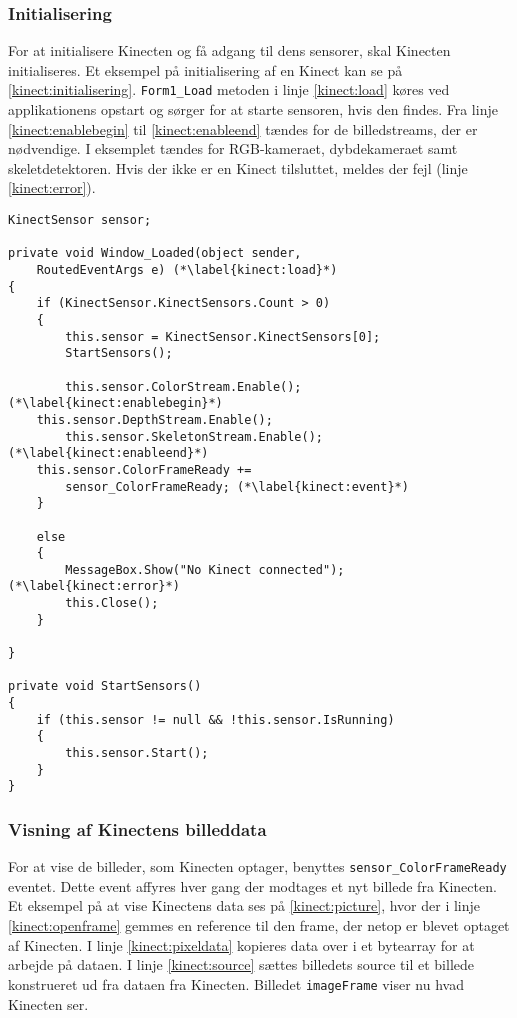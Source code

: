 \subsubsection{Initialisering}
For at initialisere Kinecten og få adgang til dens sensorer, skal Kinecten initialiseres.
Et eksempel på initialisering af en Kinect kan se på \cref{kinect:initialisering}. \lstinline[style=csharp]|Form1_Load| metoden i linje \ref{kinect:load} køres ved applikationens opstart og sørger for at starte sensoren, hvis den findes. Fra linje \ref{kinect:enablebegin} til \ref{kinect:enableend} tændes for de billedstreams, der er nødvendige. I eksemplet tændes for RGB-kameraet, dybdekameraet samt skeletdetektoren. Hvis der ikke er en Kinect tilsluttet, meldes der fejl (linje \ref{kinect:error}).

\begin{lstlisting}[style=csharp, label=kinect:initialisering, caption={Initialisering af en Kinect sensor.}]
KinectSensor sensor;

private void Window_Loaded(object sender,
	RoutedEventArgs e) (*\label{kinect:load}*)
{
    if (KinectSensor.KinectSensors.Count > 0)
    {
        this.sensor = KinectSensor.KinectSensors[0];
        StartSensors();
        
        this.sensor.ColorStream.Enable();(*\label{kinect:enablebegin}*)    
	this.sensor.DepthStream.Enable();
        this.sensor.SkeletonStream.Enable();(*\label{kinect:enableend}*)
	this.sensor.ColorFrameReady += 
		sensor_ColorFrameReady; (*\label{kinect:event}*)
    }

    else
    {
        MessageBox.Show("No Kinect connected"); (*\label{kinect:error}*)
        this.Close();
    }

}

private void StartSensors()
{
    if (this.sensor != null && !this.sensor.IsRunning)
    {
        this.sensor.Start();
    }
}
\end{lstlisting}

\subsubsection{Visning af Kinectens billeddata}
For at vise de billeder, som Kinecten optager, benyttes \lstinline[style=csharp]!sensor_ColorFrameReady! eventet. 
Dette event affyres hver gang der modtages et nyt billede fra Kinecten. 
Et eksempel på at vise Kinectens data ses på \cref{kinect:picture}, hvor der i linje \ref{kinect:openframe} gemmes en reference til den frame, der netop er blevet optaget af Kinecten.
I linje \ref{kinect:pixeldata} kopieres data over i et bytearray for at arbejde på dataen. 
I linje \ref{kinect:source} sættes billedets source til et billede konstrueret ud fra dataen fra Kinecten.
Billedet \lstinline[style=csharp]|imageFrame| viser nu hvad Kinecten ser.

